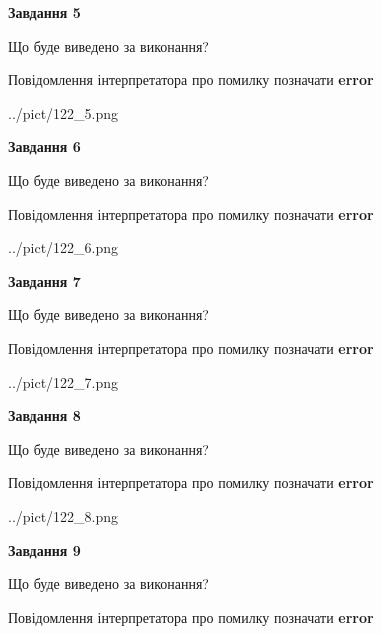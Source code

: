 \documentclass[11pt, ukrainian]{article}
\begin{document}
{\begin {large}
{\begin {center}\textbf{Завдання 5}\end {center}}\par
Що буде виведено за виконання? \par
Повідомлення інтерпретатора про помилку позначати \textbf{error}

\begin{center}
	{../pict/122_5.png}
\end{center}
\newpage

{\begin {center}\textbf{Завдання 6}\end {center}}\par
Що буде виведено за виконання? \par
Повідомлення інтерпретатора про помилку позначати \textbf{error}

\begin{center}
	{../pict/122_6.png}
\end{center}
\newpage

{\begin {center}\textbf{Завдання 7}\end {center}}\par
Що буде виведено за виконання? \par
Повідомлення інтерпретатора про помилку позначати \textbf{error}

\begin{center}
	{../pict/122_7.png}
\end{center}
\newpage

{\begin {center}\textbf{Завдання 8}\end {center}}\par
Що буде виведено за виконання? \par
Повідомлення інтерпретатора про помилку позначати \textbf{error}

\begin{center}
	{../pict/122_8.png}
\end{center}
\newpage

{\begin {center}\textbf{Завдання 9}\end {center}}\par
Що буде виведено за виконання? \par
Повідомлення інтерпретатора про помилку позначати \textbf{error}


\end{large}}
\end{document}
